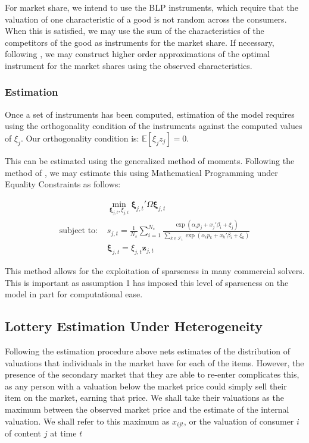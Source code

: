 \documentclass[12pt]{paper}
\newcommand{\exV}[1]{\mathbb{E} \left [ #1 \right ]}
\begin{document}
For market share, we intend to use the BLP instruments, which require
that the valuation of one characteristic of a good is not random
across the consumers. When this is satisfied, we may use the sum of
the characteristics of the competitors of the good as instruments for
the market share. If necessary, following \cite{OptimalBLPInstrument}, we
may construct higher order approximations of the optimal instrument
for the market shares using the observed characteristics.

\subsubsection{Estimation}

Once a set of instruments has been computed, estimation of the model
requires using the orthogonality condition of the instruments against
the computed values of $\xi_j$. Our orthogonality condition is:
$\exV{\xi_j z_j} = 0$.

This can be estimated using the generalized method of
moments. Following the method of \cite*{MPEC}, we may estimate
this using Mathematical Programming under Equality Constraints as
follows: 

\begin{align}
  &\min_{\bm{\xi}_{j,t}, \xi_{j,t}} \bm{\xi}_{j,t}' \Omega \bm{\xi}_{j,t}\\
    \text{subject to: } &s_{j,t} = \frac{1}{N_s} \sum_{i=1}^{N_s}
                          \frac{\exp(\alpha_i p_j + x_j'\beta_i + \xi_j)}{\sum_{k\in
                          \mathcal{F}_t} \exp( \alpha_i p_k + x_k'\beta_i +
                          \xi_k)}\\
  &\bm{\xi}_{j,t} = \xi_{j,t} \bm{z}_{j,t}  
\end{align}

This  method allows for the exploitation of sparseness in many
commercial solvers. This is important as assumption 1 has imposed this
level of sparseness on the model in part for computational ease.

\subsection{Lottery Estimation Under Heterogeneity}

Following the estimation procedure above nets estimates of the
distribution of valuations that individuals in the market have for
each of the items. However, the presence of the secondary market that
they are able to re-enter complicates this, as any person with a
valuation below the market price could simply sell their item on the
market, earning that price. We shall take their valuations as the
maximum between the observed market price and the estimate of the
internal valuation. We shall refer to this maximum as $x_{ijt}$, or
the valuation of consumer $i$ of content $j$ at time $t$
\end{document}
